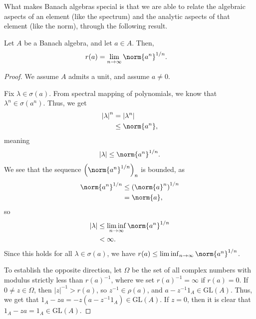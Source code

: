 \documentclass[10pt]{mypackage}
\newcommand{\GL}{\text{GL}}
\begin{document}
What makes Banach algebras special is that we are able to relate the algebraic aspects of an element (like the spectrum) and the analytic aspects of that element (like the norm), through the following result.
\begin{proposition}
  Let $A$ be a Banach algebra, and let $a\in A$. Then,
  \begin{align*}
    r(a) &= \lim_{n\rightarrow\infty}\norm{a^n}^{1/n}.
  \end{align*}
\end{proposition}
\begin{proof}
  We assume $A$ admits a unit, and assume $a\neq 0$.\newline

  Fix $\lambda\in \sigma\left(a\right)$. From spectral mapping of polynomials, we know that $\lambda^n\in \sigma\left(a^n\right)$. Thus, we get
  \begin{align*}
    \left\vert \lambda \right\vert^n &= \left\vert \lambda^n \right\vert\\
                                     &\leq \norm{a^n},
  \end{align*}
  meaning
  \begin{align*}
    \left\vert \lambda \right\vert\leq \norm{a^n}^{1/n}.
  \end{align*}
  We see that the sequence $\left(\norm{a^n}^{1/n}\right)_n$ is bounded, as
  \begin{align*}
    \norm{a^n}^{1/n} &\leq \left(\norm{a}^n\right)^{1/n}\\
                     &= \norm{a},
  \end{align*}
  so
  \begin{align*}
    \left\vert \lambda \right\vert &\leq \liminf_{n\rightarrow\infty}\norm{a^n}^{1/n}\\
                                   &<\infty.
  \end{align*}
  Since this holds for all $\lambda\in \sigma\left(a\right)$, we have $r(a) \leq \liminf_{n\rightarrow\infty}\norm{a^n}^{1/n}$.\newline

  To establish the opposite direction, let $\Omega$ be the set of all complex numbers with modulus strictly less than $r(a)^{-1}$, where we set $r(a)^{-1} = \infty$ if $r(a) = 0$. If $0\neq z\in \Omega$, then $\left\vert z \right\vert^{-1}> r(a)$, so $z^{-1}\in \rho\left(a\right)$, and $a - z^{-1}1_A\in \GL\left(A\right)$. Thus, we get that $1_A - za = -z\left(a-z^{-1}1_A\right)\in \GL\left(A\right)$. If $z = 0$, then it is clear that $1_A - za = 1_A\in \GL\left(A\right)$.\newline


\end{proof}
\end{document}
